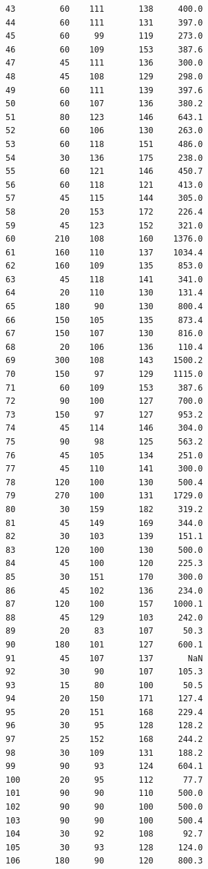 \begin{code}
\begin{verbatim}
43         60    111       138     400.0
44         60    111       131     397.0
45         60     99       119     273.0
46         60    109       153     387.6
47         45    111       136     300.0
48         45    108       129     298.0
49         60    111       139     397.6
50         60    107       136     380.2
51         80    123       146     643.1
52         60    106       130     263.0
53         60    118       151     486.0
54         30    136       175     238.0
55         60    121       146     450.7
56         60    118       121     413.0
57         45    115       144     305.0
58         20    153       172     226.4
59         45    123       152     321.0
60        210    108       160    1376.0
61        160    110       137    1034.4
62        160    109       135     853.0
63         45    118       141     341.0
64         20    110       130     131.4
65        180     90       130     800.4
66        150    105       135     873.4
67        150    107       130     816.0
68         20    106       136     110.4
69        300    108       143    1500.2
70        150     97       129    1115.0
71         60    109       153     387.6
72         90    100       127     700.0
73        150     97       127     953.2
74         45    114       146     304.0
75         90     98       125     563.2
76         45    105       134     251.0
77         45    110       141     300.0
78        120    100       130     500.4
79        270    100       131    1729.0
80         30    159       182     319.2
81         45    149       169     344.0
82         30    103       139     151.1
83        120    100       130     500.0
84         45    100       120     225.3
85         30    151       170     300.0
86         45    102       136     234.0
87        120    100       157    1000.1
88         45    129       103     242.0
89         20     83       107      50.3
90        180    101       127     600.1
91         45    107       137       NaN
92         30     90       107     105.3
93         15     80       100      50.5
94         20    150       171     127.4
95         20    151       168     229.4
96         30     95       128     128.2
97         25    152       168     244.2
98         30    109       131     188.2
99         90     93       124     604.1
100        20     95       112      77.7
101        90     90       110     500.0
102        90     90       100     500.0
103        90     90       100     500.4
104        30     92       108      92.7
105        30     93       128     124.0
106       180     90       120     800.3

\end{verbatim}
\end{code}
